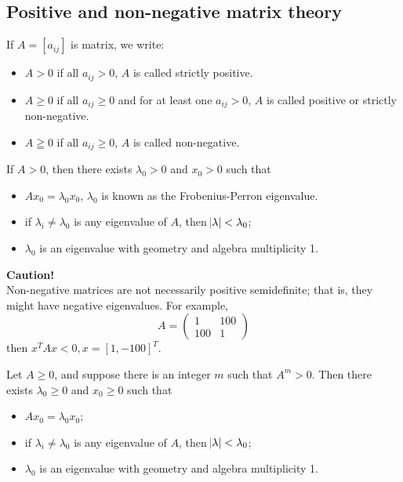 \begin{refsection}
\section{Positive and non-negative matrix theory}\label{ch:linearalgebra:sec:positive-and-non-negative-matrix-theory}
\begin{definition}
If $A=[a_{ij}]$ is matrix, we write:
\begin{itemize}
    \item $A>0$ if all $a_{ij} > 0$, $A$ is called strictly positive.
    \item $A\geq 0$ if all $a_{ij} \geq 0$ and for at least one $a_{ij} > 0$, $A$ is called positive or strictly non-negative.
    \item $A \geqq 0$ if all $a_{ij} \geq 0$, $A$ is called non-negative.
\end{itemize}
\end{definition}

\begin{theorem} \label{ch:linearalgebra:th:Frobeniusperroneigenvalue}
\cite[191]{luenberger1979introduction}If $A > 0$, then there exists $\lambda_0 >0$ and $x_0 > 0$ such that \begin{itemize}
    \item $Ax_0 = \lambda_0 x_0$, $\lambda_0$ is known as the Frobenius-Perron eigenvalue.
    \item if $\lambda_i \neq \lambda_0$ is any eigenvalue of $A$, then $\abs{\lambda} < \lambda_0$;
    \item $\lambda_0$ is an eigenvalue with geometry and algebra multiplicity 1.
\end{itemize}
\end{theorem}

\begin{mdframed}
\textbf{Caution!}\\
Non-negative matrices are not necessarily positive semidefinite; that is, they might have negative eigenvalues.
For example,
$$A = \begin{pmatrix}
1 & 100\\
100 & 1
\end{pmatrix}$$
then $x^TAx <0, x=[1,-100]^T$.
\end{mdframed}



\begin{theorem}
\cite[193]{luenberger1979introduction}Let $A \geq 0$, and suppose there is an integer $m$ such that $A^m > 0$. Then there exists $\lambda_0 \geq 0$ and $x_0 \geq 0$ such that \begin{itemize}
    \item $Ax_0 = \lambda_0 x_0$;
    \item if $\lambda_i \neq \lambda_0$ is any eigenvalue of $A$, then $\abs{\lambda} < \lambda_0$;
    \item $\lambda_0$ is an eigenvalue with geometry and algebra multiplicity 1.
\end{itemize} 
\end{theorem}


\end{refsection}
